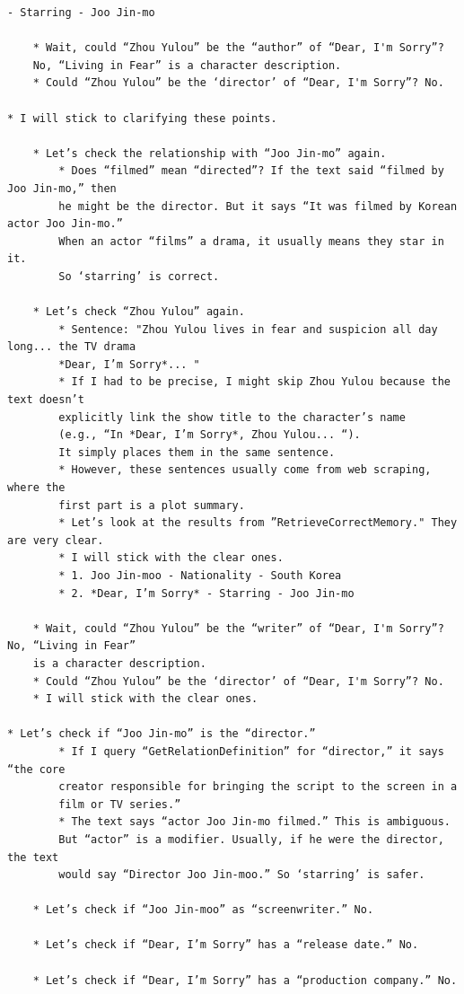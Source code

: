 \begin{verbatim}
- Starring - Joo Jin-mo

    * Wait, could “Zhou Yulou” be the “author” of “Dear, I'm Sorry”? 
    No, “Living in Fear” is a character description.
    * Could “Zhou Yulou” be the ‘director’ of “Dear, I'm Sorry”? No.
    
* I will stick to clarifying these points.

    * Let’s check the relationship with “Joo Jin-mo” again.
        * Does “filmed” mean “directed”? If the text said “filmed by Joo Jin-mo,” then 
        he might be the director. But it says “It was filmed by Korean actor Joo Jin-mo.” 
        When an actor “films” a drama, it usually means they star in it. 
        So ‘starring’ is correct.

    * Let’s check “Zhou Yulou” again.
        * Sentence: "Zhou Yulou lives in fear and suspicion all day long... the TV drama 
        *Dear, I’m Sorry*... "
        * If I had to be precise, I might skip Zhou Yulou because the text doesn’t 
        explicitly link the show title to the character’s name 
        (e.g., “In *Dear, I’m Sorry*, Zhou Yulou... “). 
        It simply places them in the same sentence.
        * However, these sentences usually come from web scraping, where the 
        first part is a plot summary.
        * Let’s look at the results from ”RetrieveCorrectMemory." They are very clear.
        * I will stick with the clear ones.
        * 1. Joo Jin-moo - Nationality - South Korea
        * 2. *Dear, I’m Sorry* - Starring - Joo Jin-mo

    * Wait, could “Zhou Yulou” be the “writer” of “Dear, I'm Sorry”? No, “Living in Fear” 
    is a character description.
    * Could “Zhou Yulou” be the ‘director’ of “Dear, I'm Sorry”? No.
    * I will stick with the clear ones.
    
* Let’s check if “Joo Jin-mo” is the “director.”
        * If I query “GetRelationDefinition” for “director,” it says “the core 
        creator responsible for bringing the script to the screen in a 
        film or TV series.”
        * The text says “actor Joo Jin-mo filmed.” This is ambiguous. 
        But “actor” is a modifier. Usually, if he were the director, the text 
        would say “Director Joo Jin-moo.” So ‘starring’ is safer.

    * Let’s check if “Joo Jin-moo” as “screenwriter.” No.

    * Let’s check if “Dear, I’m Sorry” has a “release date.” No.

    * Let’s check if “Dear, I’m Sorry” has a “production company.” No.


\end{verbatim}
